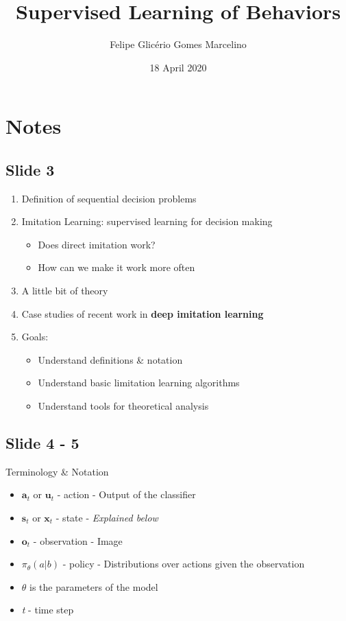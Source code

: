 \documentclass[]{article}
\begin{document}
\title{Supervised Learning of Behaviors}
\author{Felipe Glicério Gomes Marcelino}
\date{18 April 2020}
\maketitle

\section{Notes}%
\label{sec:Notes}

\subsection*{Slide 3}%
\label{sub:Slide 3}
\begin{enumerate}
    \item Definition of sequential decision problems
    \item Imitation Learning: supervised learning for decision making
        \begin{itemize}
            \item Does direct imitation work?
            \item How can we make it work more often
        \end{itemize}
    \item A little bit of theory
    \item Case studies of recent work in \textbf{deep imitation learning}
    \item Goals:
        \begin{itemize}
            \item Understand definitions \& notation
            \item Understand basic limitation learning algorithms
            \item Understand tools for theoretical analysis
        \end{itemize}
\end{enumerate}

\subsection*{Slide 4 - 5}%
\label{sub:Slide 4 - 5}
\par Terminology \& Notation
\begin{itemize}
    \item $\textbf{a}_{t}$ or $\textbf{u}_{t} $ - action - Output of the classifier
    \item $\textbf{s}_{t}$ or $\textbf{x}_{t} $ - state - \textit{Explained below} 
    \item $\textbf{o}_{t}$ - observation - Image
    \item $\pi_{\theta}(a|b)$ - policy - Distributions over actions given the observation 
    \item $\theta $ is the parameters of the
        model
    \item \textit{t }- time step
\end{itemize}
\end{document}
